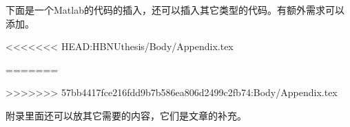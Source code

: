 下面是一个Matlab的代码的插入，还可以插入其它类型的代码。有额外需求可以添加。

<<<<<<< HEAD:HBNUthesis/Body/Appendix.tex

=======

>>>>>>> 57bb4417fce216fdd9b7b586ea806d2499c2fb74:Body/Appendix.tex

附录里面还可以放其它需要的内容，它们是文章的补充。

